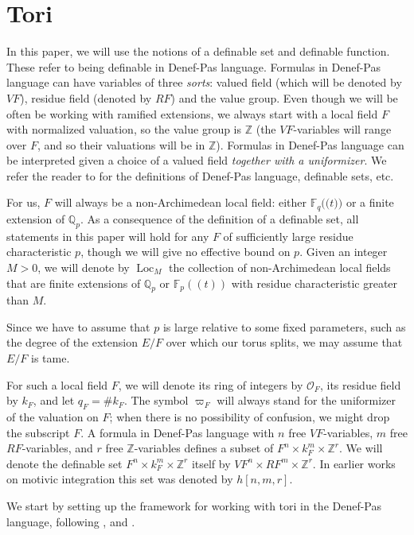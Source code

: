 \documentclass{amsart}
\newcommand{\Q}{{\mathbb Q}}
\newcommand{\F}{{\mathbb F}}
\newcommand{\Z}{{\mathbb Z}}
\newcommand{\ri}{\mathcal{O}}
\newcommand{\loc}{\operatorname{Loc}}
\def\llp{\mathopen{(\!(}}
\def\rrp{\mathopen{)\!)}}
\theoremstyle{plain}
\theoremstyle{definition}
\begin{document}
\section{Tori} 
In this paper, we will use the notions of a definable set and  definable function. These refer to being definable in Denef-Pas language. 
Formulas in Denef-Pas language can have variables of three \emph{sorts}: valued field (which will be denoted by $VF$), residue field (denoted by $RF$) and the value group. Even though we will be often be working with ramified extensions, we always start with a local field $F$ with normalized valuation, so the value group is $\Z$ (the $VF$-variables will range over $F$, and so their valuations will be in $\Z$).
Formulas in Denef-Pas language can be interpreted given a choice of a valued field \emph{together with a uniformizer}. 
We refer the reader to \cite{what's the best ref?} for the definitions of Denef-Pas language, definable sets, etc. 

For us, $F$ will always be a non-Archimedean local field: either $\F_q\llp t\rrp$ or a finite extension of $\Q_p$.
As a consequence of the definition of a definable set, all statements in this paper will hold for any $F$ of sufficiently large residue characteristic $p$, 
though we will give no effective bound on $p$. 
Given an integer $M>0$, we will denote by $\loc_M$ the collection of non-Archimedean local fields that are finite extensions of $\Q_p$ or $\F_p((t))$ with residue characteristic greater than $M$. 

Since we have to assume that $p$ is large relative to some fixed parameters, such as the degree of the extension $E/F$ over which our torus splits, we may assume that $E/F$ is tame.  

For such a local field $F$, we will denote its ring of integers by $\ri_F$, its residue field by $k_F$, and let $q_F=\# k_F$. The symbol $\varpi_F$ will always stand for the uniformizer of the valuation on $F$; when there is no possibility of confusion, we might drop the subscript $F$. 
A formula in Denef-Pas language  with $n$ free $VF$-variables, $m$ free $RF$-variables, and $r$ free 
$\Z$-variables 
defines a subset of $F^n\times k_F^m \times \Z^r$. 
We will denote the definable set $F^n\times k_F^m \times \Z^r$ itself by $VF^n\times RF^m\times \Z^r$. In earlier works on motivic integration this set was denoted by $h[n,m,r]$. 

We start by setting up the framework for working with tori in the Denef-Pas language, following \cite{cluckers-hales-loeser}, \cite{CGH-2} and \cite{hales:transfert}.
\end{document}
